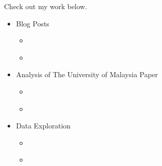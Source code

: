 \documentclass[letterpaper,10pt,english]{jupyterBook}
\begin{document}
\sphinxAtStartPar
Check out my work below.
\begin{itemize}
\item {} 
\sphinxAtStartPar
Blog Posts

\begin{itemize}
\item {} 
\sphinxAtStartPar
{\hyperref[\detokenize{notebooks/hidden_post::doc}]{}}

\item {} 
\sphinxAtStartPar
{\hyperref[\detokenize{notebooks/full_post::doc}]{}}

\end{itemize}
\end{itemize}
\begin{itemize}
\item {} 
\sphinxAtStartPar
Analysis of The University of Malaysia Paper

\begin{itemize}
\item {} 
\sphinxAtStartPar
{\hyperref[\detokenize{notebooks/replicating_paper::doc}]{}}

\item {} 
\sphinxAtStartPar
{\hyperref[\detokenize{notebooks/testing_malaysian_paper::doc}]{}}

\end{itemize}
\end{itemize}
\begin{itemize}
\item {} 
\sphinxAtStartPar
Data Exploration

\begin{itemize}
\item {} 
\sphinxAtStartPar
{\hyperref[\detokenize{notebooks/data_exploration::doc}]{}}

\item {} 
\sphinxAtStartPar
{\hyperref[\detokenize{notebooks/geo_coding::doc}]{}}

\end{itemize}
\end{itemize}
\end{document}
